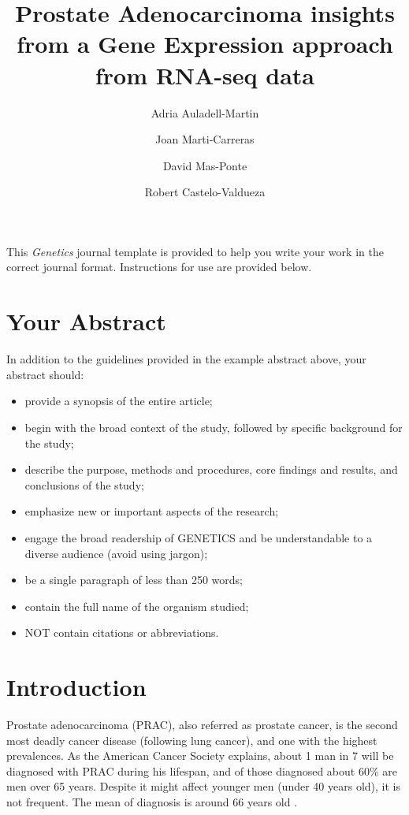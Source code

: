 \documentclass[9pt,twocolumn,twoside]{gsajnl}
\title{Prostate Adenocarcinoma insights from a Gene Expression approach from RNA-seq data}
\author[$\ast$,$\dagger$]{Adria Auladell-Martin}
\author[$\ast$,$\dagger$]{Joan Marti-Carreras}
\author[$\ast$,$\dagger$]{David Mas-Ponte}
\author[$\ast$,1]{Robert Castelo-Valdueza}
\affil[$\ast$]{M.Sc. in Bioinformatics at Department of Experimental and Health Sciences (CEXS), Universitat Pompeu Fabra}
\affil[$\dagger$]{Authors Contributed Equally to this work}
\begin{document}
\maketitle
\thispagestyle{firststyle}
\marginmark
\firstpagefootnote
{}
\vspace{-11pt}%

\lettrine[lines=2]{\color{color2}T}{}his \textit{Genetics} journal template is provided to help you write your work in the correct journal format. Instructions for use are provided below. 

\section*{Your Abstract}

In addition to the guidelines provided in the example abstract above, your abstract should:

\begin{itemize}
\item provide a synopsis of the entire article;
\item begin with the broad context of the study, followed by specific background for the study;
\item describe the purpose, methods and procedures, core findings and results, and conclusions of the study;
\item emphasize new or important aspects of the research;
\item engage the broad readership of GENETICS and be understandable to a diverse audience (avoid using jargon);
\item be a single paragraph of less than 250 words;
\item contain the full name of the organism studied;
\item NOT contain citations or abbreviations.
\end{itemize}


\section*{Introduction}
Prostate adenocarcinoma (PRAC), also referred as prostate cancer, is  the second most deadly cancer disease (following lung cancer), and one with the highest prevalences. As the American Cancer Society explains, about 1 man in 7 will be diagnosed with PRAC during his lifespan, and of those diagnosed about 60\% are men over 65 years. Despite it might affect younger men (under 40 years old), it is not frequent. The mean of diagnosis is around 66 years old \citep{prostatestatistics}.
\end{document}
